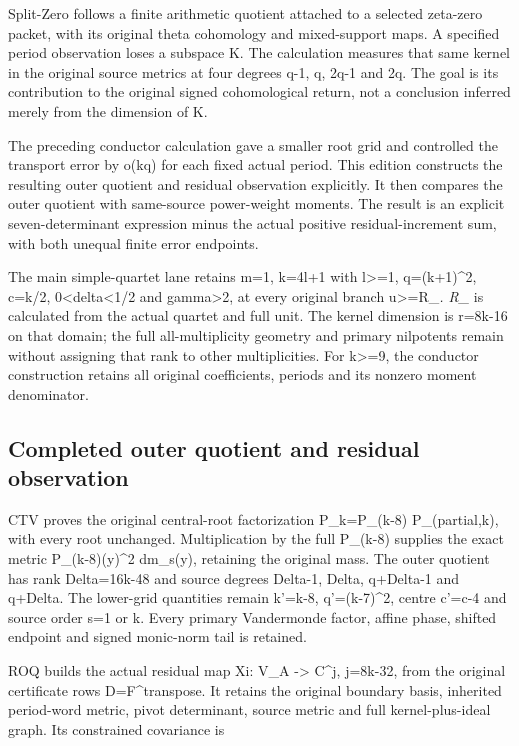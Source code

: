 \documentclass[
]{article}
\begin{document}
Split-Zero follows a finite arithmetic quotient attached to a selected
zeta-zero packet, with its original theta cohomology and mixed-support
maps. A specified period observation loses a subspace K. The calculation
measures that same kernel in the original source metrics at four degrees
q-1, q, 2q-1 and 2q. The goal is its contribution to the original signed
cohomological return, not a conclusion inferred merely from the
dimension of K.

The preceding conductor calculation gave a smaller root grid and
controlled the transport error by o(kq) for each fixed actual period.
This edition constructs the resulting outer quotient and residual
observation explicitly. It then compares the outer quotient with
same-source power-weight moments. The result is an explicit
seven-determinant expression minus the actual positive
residual-increment sum, with both unequal finite error endpoints.

The main simple-quartet lane retains m=1, k=4l+1 with l\textgreater=1,
q=(k+1)\^{}2, c=k/2, 0\textless delta\textless1/2 and
gamma\textgreater2, at every original branch
\textbar u\textbar\textgreater=R\_\emph{. R\_} is calculated from the
actual quartet and full unit. The kernel dimension is r=8k-16 on that
domain; the full all-multiplicity geometry and primary nilpotents remain
without assigning that rank to other multiplicities. For
k\textgreater=9, the conductor construction retains all original
coefficients, periods and its nonzero moment denominator.

\subsection{Completed outer quotient and residual
observation}\label{completed-outer-quotient-and-residual-observation}

CTV proves the original central-root factorization P\_k=P\_(k-8)
P\_(partial,k), with every root unchanged. Multiplication by the full
P\_(k-8) supplies the exact metric \textbar P\_(k-8)(y)\textbar\^{}2
dm\_s(y), retaining the original mass. The outer quotient has rank
Delta=16k-48 and source degrees Delta-1, Delta, q+Delta-1 and q+Delta.
The lower-grid quantities remain k'=k-8, q'=(k-7)\^{}2, centre c'=c-4
and source order s=1 or k. Every primary Vandermonde factor, affine
phase, shifted endpoint and signed monic-norm tail is retained.

ROQ builds the actual residual map Xi: V\_A -\textgreater{} C\^{}j,
j=8k-32, from the original certificate rows D=F\^{}transpose. It retains
the original boundary basis, inherited period-word metric, pivot
determinant, source metric and full kernel-plus-ideal graph. Its
constrained covariance is
\end{document}
